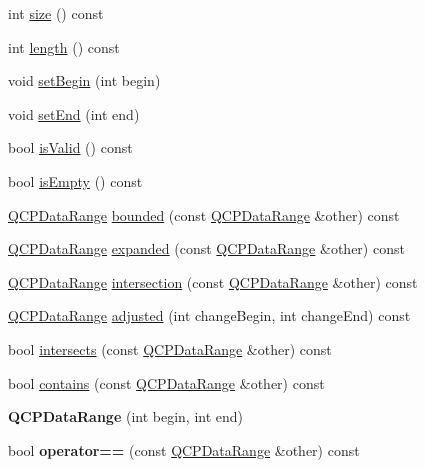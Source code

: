 \begin{DoxyCompactItemize}
\item 
int \hyperlink{class_q_c_p_data_range_aec29c6f4234c01ed7a56c3bb0e75f340}{size} () const 
\item 
int \hyperlink{class_q_c_p_data_range_a4e65d1bf09fce82dbc67a7b71b2cf088}{length} () const 
\item 
void \hyperlink{class_q_c_p_data_range_a54ff59048e01e46ac4aefafc844626c6}{set\+Begin} (int begin)
\item 
void \hyperlink{class_q_c_p_data_range_a277f1a9eafe70b9184d9c00b641ae5de}{set\+End} (int end)
\item 
bool \hyperlink{class_q_c_p_data_range_a063eeb2c81e86900d974936cbb83f508}{is\+Valid} () const 
\item 
bool \hyperlink{class_q_c_p_data_range_a2ab2e0710dbd4493133ab582ef7e5fc3}{is\+Empty} () const 
\item 
\hyperlink{class_q_c_p_data_range}{Q\+C\+P\+Data\+Range} \hyperlink{class_q_c_p_data_range_a4de1bec5a6e1145bd332d93ac2cc8327}{bounded} (const \hyperlink{class_q_c_p_data_range}{Q\+C\+P\+Data\+Range} \&other) const 
\item 
\hyperlink{class_q_c_p_data_range}{Q\+C\+P\+Data\+Range} \hyperlink{class_q_c_p_data_range_a92eb8e85db62f0f833486fa4521fb586}{expanded} (const \hyperlink{class_q_c_p_data_range}{Q\+C\+P\+Data\+Range} \&other) const 
\item 
\hyperlink{class_q_c_p_data_range}{Q\+C\+P\+Data\+Range} \hyperlink{class_q_c_p_data_range_a2c56cbc35c3beaed34fca1839d570520}{intersection} (const \hyperlink{class_q_c_p_data_range}{Q\+C\+P\+Data\+Range} \&other) const 
\item 
\hyperlink{class_q_c_p_data_range}{Q\+C\+P\+Data\+Range} \hyperlink{class_q_c_p_data_range_a7a7a144cd3df55a6e011b9a84f0f8b69}{adjusted} (int change\+Begin, int change\+End) const 
\item 
bool \hyperlink{class_q_c_p_data_range_afda3603f6ca7cb5c518cdaeea45af267}{intersects} (const \hyperlink{class_q_c_p_data_range}{Q\+C\+P\+Data\+Range} \&other) const 
\item 
bool \hyperlink{class_q_c_p_data_range_a691620b718e4bcefb77bcdde88bd1b34}{contains} (const \hyperlink{class_q_c_p_data_range}{Q\+C\+P\+Data\+Range} \&other) const 
\item 
{\bfseries Q\+C\+P\+Data\+Range} (int begin, int end)\hypertarget{class_q_c_p_data_range_a6c7f4a3684210423270515403060e9cf}{}\label{class_q_c_p_data_range_a6c7f4a3684210423270515403060e9cf}

\item 
bool {\bfseries operator==} (const \hyperlink{class_q_c_p_data_range}{Q\+C\+P\+Data\+Range} \&other) const \hypertarget{class_q_c_p_data_range_a6947b187a6562b98e22e32a5f9663de2}{}\label{class_q_c_p_data_range_a6947b187a6562b98e22e32a5f9663de2}


\end{DoxyCompactItemize}
